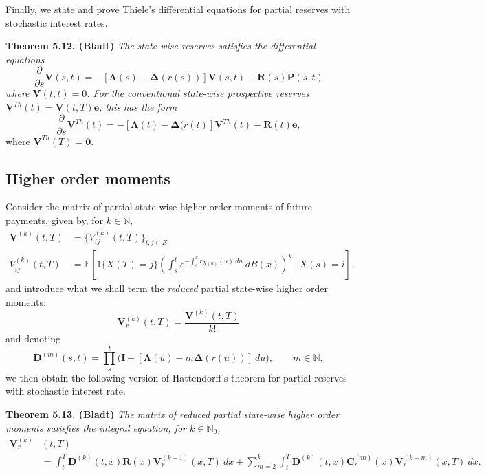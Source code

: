 \documentclass[
]{book}
\begin{document}
Finally, we state and prove Thiele's differential equations for partial reserves with stochastic interest
rates.

\textbf{Theorem 5.12. (Bladt)} \emph{The state-wise reserves satisfies the differential equations}
\[
\frac{\partial}{\partial s}\mathbf V(s,t)=-[\mathbf \Lambda(s) - \mathbf\Delta(r(s))]\mathbf V(s,t) - \mathbf R(s)\mathbf P(s,t)
\]
\emph{where \(\mathbf V(t,t)=0\). For the conventional state-wise prospective reserves \(\mathbf V^{Th}(t)=\mathbf V(t,T)\mathbf e\), this has the form}
\[
\frac{\partial}{\partial s}\mathbf V^{Th}(t)=-[\mathbf \Lambda(t) - \mathbf\Delta(r(t)]\mathbf V^{Th}(t) - \mathbf R(t)\mathbf e,
\]
where \(\mathbf V^{Th}(T)=\mathbf 0\).

\hypertarget{higher-order-moments}{%
\subsection{Higher order moments}\label{higher-order-moments}}

Consider the matrix of partial state-wise higher order moments of future payments, given by, for \(k\in\mathbb N\),
\begin{align*}
\mathbf V^{(k)}(t,T)&=\Big\{V_{ij}^{(k)}(t,T)\Big\}_{i,j\in E}\\
V_{ij}^{(k)}(t,T)&=\mathbb E\left[\left.1\{X(T)=j\}\left(\int_s^te^{-\int_s^xr_{X(u)}(u)\ du}\ dB(x)\right)^k \ \right\vert\ X(s)=i\right],
\end{align*}
and introduce what we shall term the \emph{reduced} partial state-wise higher order moments:
\[
\mathbf V_r^{(k)}(t,T)=\frac{\mathbf V^{(k)}(t,T)}{k!}
\]
and denoting
\[
\mathbf D^{(m)}(s,t)=\prod_s^t\Big(\mathbf I + [\mathbf\Lambda(u)-m\mathbf\Delta(r(u))]\ du\Big),\qquad m\in\mathbb N,
\]
we then obtain the following version of Hattendorff's theorem for partial reserves with stochastic interest rate.

\textbf{Theorem 5.13. (Bladt)} \emph{The matrix of reduced partial state-wise higher order moments satisfies the integral equation, for \(k\in\mathbb N_0\),}
\begin{align*}
\mathbf V_r^{(k)}&(t,T)\\
&=\int_t^T\mathbf D^{(k)}(t,x)\mathbf R(x)\mathbf V^{(k-1)}_r(x,T)\ dx+\sum_{m=2}^k\int_t^T\mathbf D^{(k)}(t,x)\mathbf C^{(m)}_r(x)\mathbf V^{(k-m)}_r(x,T)\ dx.
\end{align*}
\end{document}
